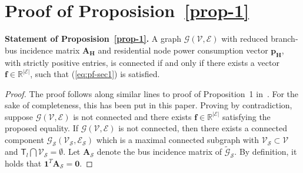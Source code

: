 \documentclass[sigconf]{acmart}
\begin{document}
\newpage

\appendix 

\section{Proof of Proposision~\ref{prop-1}}

\noindent \textbf{Statement of Proposision~\ref{prop-1}.}
A graph $\mathcal{G}(\mathcal{V},\mathcal{E})$ with reduced branch-bus incidence matrix $\mathbf{A_H}$ and residential node power consumption vector $\mathbf{p_H}$, with strictly positive entries, is connected if and only if there exists a vector $\mathbf{f}\in\mathbb{R}^{|\mathcal{E}|}$, such that (\ref{eq:pf-sec1}) is satisfied.

\begin{proof}
	The proof follows along similar lines to proof of Proposition~1 in~\cite{manish2019}. For the sake of completeness, this has been put in this paper. Proving by contradiction, suppose $\mathcal{G}(\mathcal{V},\mathcal{E})$ is not connected and there exists $\mathbf{f}\in\mathbb{R}^{|\mathcal{E}|}$ satisfying the proposed equality. If $\mathcal{G}(\mathcal{V},\mathcal{E})$ is not connected, then there exists a connected component $\mathcal{G}_{\mathcal{S}}(\mathcal{V}_{\mathcal{S}},\mathcal{E}_{\mathcal{S}})$ which is a maximal connected subgraph with $\mathcal{V}_{\mathcal{S}}\subset\mathcal{V}$ and $\mathsf{T}_l\bigcap\mathcal{V}_\mathcal{S}=\emptyset$. Let $\mathbf{A}_\mathcal{S}$ denote the bus incidence matrix of $\tilde{\mathcal{G}}_{\mathcal{S}}$. By definition, it holds that $\mathbf{1}^T\mathbf{A}_\mathcal{S}=\mathbf{0}$.
	

\end{proof}
\end{document}
